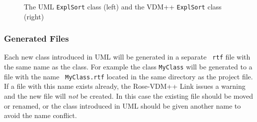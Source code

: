 \documentclass[\pformat,12pt]{article}
\newcommand{\vdmpp}{VDM++}
\newcommand{\link}{Rose-\vdmpp{} Link}
\begin{document}
\begin{figure}[htb]
\begin{center}
\mbox{}
\hspace{0.2cm}
\caption{The UML {\tt ExplSort} class (left) and the \vdmpp{} {\tt ExplSort} class (right)\label{fig:ExplSortVDMUML}}
\end{center}
\end{figure}

\subsubsection*{Generated Files}

Each new class introduced in UML will be generated in a separate {\tt
  rtf} file with the same name as the class. For example the class
{\tt MyClass} will be generated to a file with the name {\tt
  MyClass.rtf} located in the same directory as the project file. If a
file with this name exists already, the \link{} issues a warning and
the new file will {\em not} be created. In this case the existing file
should be moved or renamed, or the class introduced in UML should be given
another name to avoid the name conflict.
\end{document}
